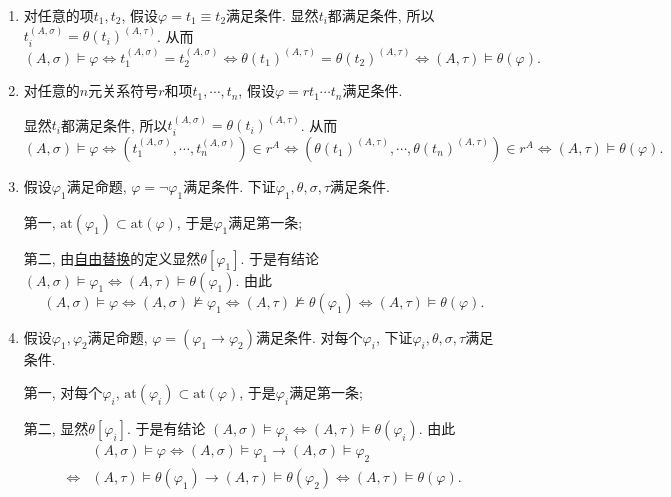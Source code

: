 \begin{enumerate}
    \item 对任意的项$t_1,t_2$, 假设$\varphi=t_1\equiv t_2$满足条件.
    显然$t_i$都满足条件, 所以$t_i^{(A,\sigma)}=\theta(t_i)^{(A,\tau)}$. 从而
    \[
        (A,\sigma)\models\varphi\iff t_1^{(A,\sigma)}=t_2^{(A,\sigma)}\iff
        \theta(t_1)^{(A,\tau)}=\theta(t_2)^{(A,\tau)}\iff
        (A,\tau)\models\theta(\varphi).
    \]

    \item 对任意的$n$元关系符号$r$和项$t_1,\cdots,t_n$,
    假设$\varphi=rt_1\cdots t_n$满足条件.

    \hspace{2.17em}
    显然$t_i$都满足条件, 所以$t_i^{(A,\sigma)}=\theta(t_i)^{(A,\tau)}$. 从而
    \[
        (A,\sigma)\models\varphi\iff
        (t_1^{(A,\sigma)},\cdots,t_n^{(A,\sigma)})\in r^A\iff
        (\theta(t_1)^{(A,\tau)},\cdots,\theta(t_n)^{(A,\tau)})\in r^A\iff
        (A,\tau)\models\theta(\varphi).
    \]

    \item 假设$\varphi_1$满足命题, $\varphi=\neg\varphi_1$满足条件.
    下证$\varphi_1,\theta,\sigma,\tau$满足条件.

    \hspace{2.17em}
    第一, $\mathrm{at}(\varphi_1)\subset\mathrm{at}(\varphi)$,
    于是$\varphi_1$满足第一条;
    
    \hspace{2.17em}
    第二, 由\href{../../01 一阶语言/04 一般替换#nameddest=sec:定义1.4}
    {自由替换}的定义显然$\theta[\varphi_1]$. 于是有结论
    $(A,\sigma)\models\varphi_1\iff(A,\tau)\models\theta(\varphi_1)$. 由此
    \[
        (A,\sigma)\models\varphi\iff(A,\sigma)\not\models\varphi_1\iff
        (A,\tau)\not\models\theta(\varphi_1)\iff(A,\tau)\models\theta(\varphi).
    \]

    \item 假设$\varphi_1,\varphi_2$满足命题, $\varphi=(\varphi_1\to\varphi_2)$满足条件.
    对每个$\varphi_i$, 下证$\varphi_i,\theta,\sigma,\tau$满足条件.

    \hspace{2.17em}
    第一, 对每个$\varphi_i$, $\mathrm{at}(\varphi_i)\subset\mathrm{at}(\varphi)$,
    于是$\varphi_i$满足第一条;
    
    \hspace{2.17em}
    第二, 显然$\theta[\varphi_i]$. 于是有结论
    $(A,\sigma)\models\varphi_i\iff(A,\tau)\models\theta(\varphi_i)$. 由此
    \[\begin{aligned}
        &(A,\sigma)\models\varphi\iff
        (A,\sigma)\models\varphi_1\to(A,\sigma)\models\varphi_2\\[-3pt]
        \iff&(A,\tau)\models\theta(\varphi_1)\to(A,\tau)\models\theta(\varphi_2)
        \iff(A,\tau)\models\theta(\varphi).
    \end{aligned}\]


\end{enumerate}
